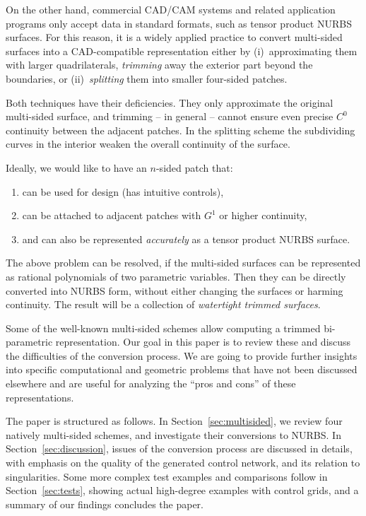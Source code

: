 \documentclass[9pt,academicons]{article}
\begin{document}
On the other hand, commercial CAD/CAM systems and related application programs only accept
data in standard formats, such as tensor product NURBS surfaces. For this reason, it is a
widely applied practice to convert multi-sided surfaces into a CAD-compatible
representation either by (i)~approximating them with larger quadrilaterals,
\emph{trimming} away the exterior part beyond the boundaries, or (ii)~\emph{splitting}
them into smaller four-sided patches.

Both techniques have their deficiencies. They only approximate the original multi-sided
surface, and trimming -- in general -- cannot ensure even precise $C^0$ continuity between the
adjacent patches. In the splitting scheme the subdividing curves in the interior
weaken the overall continuity of the surface.

Ideally, we would like to have an $n$-sided patch that:
\begin{enumerate}[label=\roman*),leftmargin=3\parindent]
\item can be used for design (has intuitive controls),
\item can be attached to adjacent patches with $G^1$ or higher continuity,
\item and can also be represented \emph{accurately} as a tensor product NURBS surface.
\end{enumerate}

The above problem can be resolved, if the multi-sided surfaces can be represented as rational
polynomials of two parametric variables. Then they can be directly converted into
NURBS form, without either changing the surfaces or harming continuity. The result will be
a collection of \emph{watertight trimmed surfaces}.
 
Some of the well-known multi-sided schemes allow computing a trimmed bi-parametric
representation. Our goal in this paper is to review these and discuss the difficulties of
the conversion process. We are going to provide further insights into specific
computational and geometric problems that have not been discussed elsewhere and are
useful for analyzing the ``pros and cons'' of these representations.

The paper is structured as follows. In Section~\ref{sec:multisided},
we review four natively multi-sided schemes, and investigate their conversions to NURBS.
In Section~\ref{sec:discussion}, issues of the conversion process are discussed in details,
with emphasis on the quality of the generated control network, and its relation to singularities.
Some more complex test examples and comparisons follow in Section~\ref{sec:tests},
showing actual high-degree examples with control grids,
and a summary of our findings concludes the paper.
\end{document}
